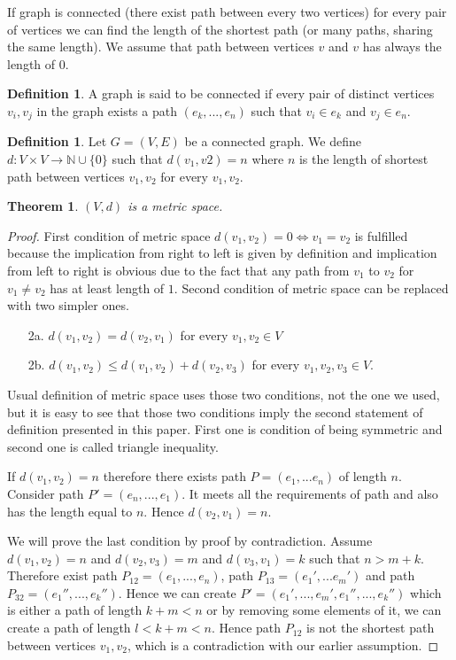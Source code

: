 \documentclass[11pt]{article}
\theoremstyle{plain}
\newtheorem{theorem}[thm]{Theorem}
\theoremstyle{definition}
\newtheorem{definition}[thm]{Definition}
\renewcommand\leq{\leqslant}
\begin{document}
If graph is connected (there exist path between every two vertices) for every pair of vertices we can find the length of the shortest path (or many paths, sharing the same length). We assume that path between vertices $v$ and $v$ has always the length of $0$.
\begin{definition}
     A graph is said to be connected if every pair of distinct vertices $v_i,v_j$ in the graph exists a path $ (e_{k},...,e_{n})$ such that $v_i \in e_{k}$ and $v_j\in e_{n}$.
\end{definition}
\begin{definition}
    Let $G = (V,E)$ be a connected graph. We define $d: V \times V \rightarrow \mathbb{N} \cup \{0\} $ such that $d(v_{1},v{2}) = n$ where $n$ is the length of shortest path between vertices $v_1,v_2$ for every $v_1,v_2$.
\end{definition}
\begin{theorem}
    $(V,d)$ is a metric space. 
\end{theorem}
\begin{proof}
    First condition of metric space $d(v_{1},v_{2}) = 0 \Leftrightarrow v_{1} = v_{2}$ is fulfilled because the implication from right to left is given by definition and implication from left to right is obvious due to the fact that any path from $v_1$ to $v_2$ for $v_1 \neq v_2$ has at least length of $1$.
    Second condition of metric space can be replaced with two simpler ones. 
    \begin{enumerate}
        \item[2a.] $d(v_1,v_2) = d(v_2,v_1)$ for every $v_1, v_2 \in V$
        \item[2b.] $d(v_1,v_2) \leq d(v_1,v_2) + d(v_2,v_3)$ for every $v_1,v_2,v_3 \in V.$
    \end{enumerate}
    Usual definition of metric space uses those two conditions, not the one we used, but it is easy to see that those two conditions imply the second  statement of definition presented in this paper. First one is condition of being symmetric and second one is called triangle inequality.
    
    If $d(v_1,v_2) = n$ therefore there exists path $P = (e_1,...e_n)$ of length $n$. Consider path $P' = (e_n,...,e_1)$. It meets all the requirements of path and also has the length equal to $n$. Hence $d(v_2,v_1) = n$.
    
    We will prove the last condition by proof by contradiction. Assume $d(v_1,v_2) = n$ and $d(v_2,v_3) = m $ and $d(v_3,v_1) =k$ such that $ n > m+k$. 
    Therefore exist path $P_{12} = (e_1,...,e_n)$, path $P_{13} = (e_1',...e_m')$ and path $P_{32} = (e_1'',...,e_k'')$. Hence we can create $P' = (e_1',...,e_m',e_1'',...,e_k'')$ which is either a path of length $k+m <n$ or by removing some elements of it, we can create a path of length $ l < k+m < n$. Hence path $P_{12}$ is not the shortest path between vertices $v_1,v_2$, which is a contradiction with our earlier assumption.
    
\end{proof}
\end{document}
